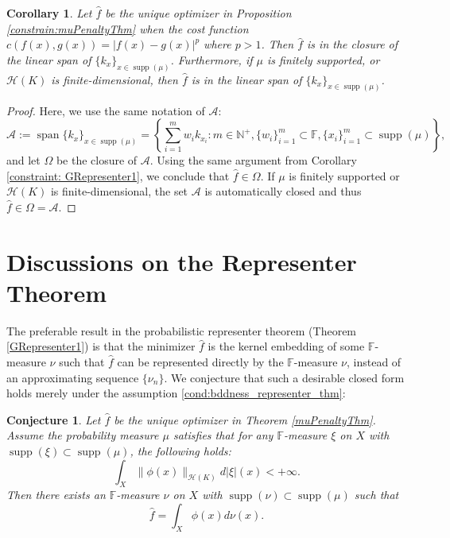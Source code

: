 \documentclass{amsart}
\numberwithin{equation}{section}
\DeclareMathOperator{\supp}{supp}
\DeclareMathOperator{\linearspan}{span}
\theoremstyle{plain}
\newtheorem{corollary}[subsection]{Corollary}
\newtheorem{conjecture}[subsection]{Conjecture}
\theoremstyle{remark}
\theoremstyle{definition}
\begin{document}
\begin{corollary}\label{constraint:GRepresenter2}
    Let $\hat{f}$ be the unique optimizer in Proposition \ref{constrain:muPenaltyThm} when the cost function $c(f(x), g(x)) = |f(x)-g(x)|^p$ where $p>1$.
    Then $\hat{f}$ is in the closure of the linear span of $\{k_x\}_{x \in \supp(\mu)}$.
    Furthermore, if $\mu$ is finitely supported, or $\mathscr{H}(K)$ is finite-dimensional, 
 then $\hat{f}$ is in the linear span of $\{k_x\}_{x \in \supp(\mu)}$.
\end{corollary}
 \begin{proof}
Here, we use the same notation of $\mathscr{A}$:
     \begin{equation*}
        \mathscr{A}:= \linearspan{\{k_x\}_{x \in \supp(\mu)}} = \left\{\sum_{i=1}^m w_i k_{x_i}: m \in \mathbb{N}^{+},  \{w_i\}_{i=1}^m \subset \mathbb{F},  \{x_i\}_{i=1}^m \subset \supp(\mu) \right \},
    \end{equation*}
and let $\Omega$ be the closure of $\mathscr{A}$. Using the same argument from Corollary \ref{constraint: GRepresenter1}, we conclude that $\hat{f} \in \Omega$. 
 If $\mu$ is finitely supported or $\mathscr{H}(K)$ is finite-dimensional, the set $\mathscr{A}$ is automatically closed and thus $\hat{f} \in \Omega = \mathscr{A}$.
\end{proof}



 \vspace{0.3cm}

\section{Discussions on the Representer Theorem}\label{section:conjecture}
The preferable result in the probabilistic representer theorem (Theorem \ref{GRepresenter1}) is that the minimizer $\hat{f}$ is the kernel embedding of some $\mathbb{F}$-measure $\nu$ such that $\hat{f}$ can be represented directly by the $\mathbb{F}$-measure $\nu$, instead of an approximating sequence $\{\nu_n\}$. 
We conjecture that such a desirable closed form holds merely under the assumption \ref{cond:bddness_representer_thm}:

\begin{conjecture}\label{conj:representer}
    Let $\hat{f}$ be the unique optimizer in Theorem \ref{muPenaltyThm}.
    Assume the probability measure $\mu$ satisfies that for any $\mathbb{F}$-measure $\xi$ on $X$ with $\supp (\xi) \subset \supp(\mu)$, the following holds: 
\begin{equation*}
    \int_X \|\phi(x)\|_{\mathscr{H}(K)}d|\xi|(x)<+\infty.
\end{equation*}
Then there exists an $\mathbb{F}$-measure $\nu$ on $X$ with  $\supp(\nu) \subset \supp(\mu)$ such that 
\begin{equation*}
    \hat{f} = \int_{X} \phi(x) d\nu(x).
\end{equation*} 
\end{conjecture}
\end{document}

